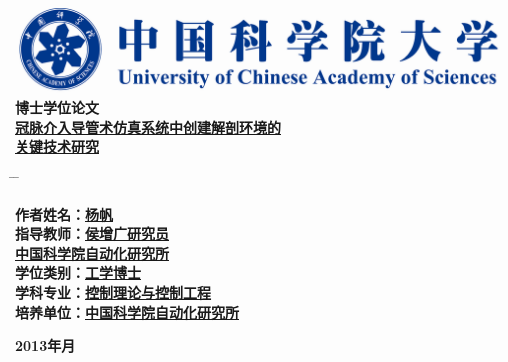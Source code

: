 \vspace*{1.2cm} %
\begin{center}
  \includegraphics[width=13.5cm]{../Figures/UCAS}\\
\vspace{1.7cm} {\yihao \hei \textbf{博士学位论文}}\\
\vspace{2.4cm}
{\xiaoerhao \song \textbf{\underline{冠脉介入导管术仿真系统中创建解剖环境的}}}\\
\sihao \vspace{0.2cm}
{\xiaoerhao \song \textbf{\underline{关键技术研究}}}
\end{center}
\sanhao \vspace{2.0cm}
\begin{tabbing}
\hspace*{-0.8cm} \= \hspace{6.4cm} \= \kill

\>\textbf{作者姓名：\underline{\hspace{4.8cm}杨\;\;\;\;帆\;\;\hspace{6.3cm}}}\\
\>\textbf{指导教师：\underline{\hspace{4.8cm}侯增广\;\;研究员\hspace{4.6cm}}}\\
\>\textbf{\hspace*{2.8cm}\underline{\hspace{3cm}中国科学院自动化研究所 \hspace{4cm}}}\\

\>\textbf{学位类别：\underline{\hspace{4.8cm}工学博士\hspace{6.0cm}}}\\

\>\textbf{学科专业：\underline{\hspace{3.55cm}控制理论与控制工程\hspace{4.5cm}}}\\


\>\textbf{培养单位：\underline{\hspace{3cm}中国科学院自动化研究所 \hspace{4cm}}}\\

\end{tabbing}
\begin{center}
\vspace{1.0cm}
  \textbf{2013\;\;年\;\;\;月}
\end{center}

